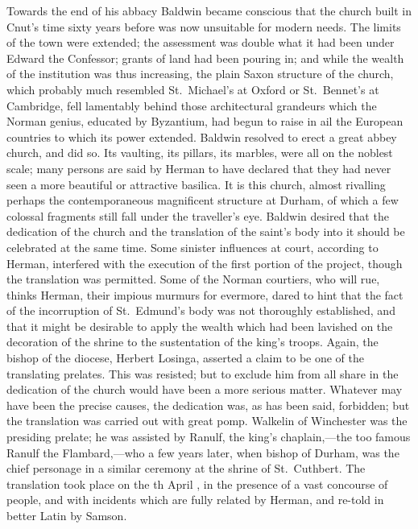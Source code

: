 \documentclass[10pt]{book}
\begin{document}
{Towards the end of his abbacy Baldwin became conscious that the church built in Cnut's time sixty years before was now unsuitable for modern needs. The limits of the town were extended; the assessment was double what it had been under Edward the Confessor; grants of land had been pouring in; and while the wealth of the institution was thus increasing, the plain Saxon structure of the church, which probably much resembled St.\ Michael's at Oxford or St.\ Bennet's at Cambridge, fell lamentably behind those architectural grandeurs which the Norman genius, educated by Byzantium, had begun to raise in ail the European countries to which its power extended. Baldwin resolved to erect a great abbey church, and did so. Its vaulting, its pillars, its marbles, were all on the noblest scale; many persons are said by Herman to have declared that they had never seen a more beautiful or attractive basilica. It is this church, almost rivalling perhaps the contemporaneous magnificent structure at Durham, of which a few colossal fragments still fall under the traveller's eye. Baldwin desired that the dedication of the church and the translation of the saint's body into it should be celebrated at the same time. Some sinister influences at court, according to Herman, interfered with the execution of the first portion of the project, though the translation was permitted. Some of the Norman courtiers, who will rue, thinks Herman, their impious murmurs for evermore, dared to hint that the fact of the incorruption of St.\ Edmund's body was not thoroughly established, and that it might be desirable to apply the wealth which had been lavished on the decoration of the shrine to the sustentation of the king's troops. Again, the bishop of the diocese, Herbert Losinga, asserted a claim to be one of the translating prelates. This was resisted; but to exclude him from all share in the dedication of the church would have been a more serious matter. Whatever may have been the precise causes, the dedication was, as has been said, forbidden; but the translation was carried out with great pomp. Walkelin of Winchester was the presiding prelate; he was assisted by Ranulf, the king's chaplain,---the too famous Ranulf the Flambard,---who a few years later, when bishop of Durham, was the chief personage in a similar ceremony at the shrine of St.\ Cuthbert. The translation took place on the th April , in the presence of a vast concourse of people, and with incidents which are fully related by Herman, and re-told in better Latin by Samson.

}
\end{document}
